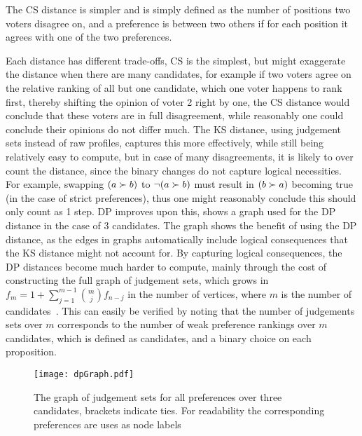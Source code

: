 The CS distance is simpler and is simply defined as the number of positions two
voters disagree on, and a preference is between two others if for each position
it agrees with one of the two preferences.

Each distance has different trade-offs, CS is the simplest, but might
exaggerate the distance when there are many candidates, for example if two voters
agree on the relative ranking of all but one candidate, which one voter happens
to rank first, thereby shifting the opinion of voter 2 right by one, the CS
distance would conclude that these voters are in full disagreement, while
reasonably one could conclude their opinions do not differ much. The KS
distance, using judgement sets instead of raw profiles, captures this more
effectively, while still being relatively easy to compute, but in case of many
disagreements, it is likely to over count the distance, since the binary
changes do not capture logical necessities. For example, swapping $( a \succ
	b)$ to $\neg (a \succ b)$ must result in $(b \succ a)$ becoming true (in the
case of strict preferences), thus one might reasonably conclude this should
only count as 1 step. DP improves upon this,  shows a
graph used for the DP distance in the case of 3 candidates. The graph shows the
benefit of using the DP distance, as the edges in graphs automatically include
logical consequences that the KS distance might not account for. By
capturing logical consequences, the DP distances become much harder to
compute, mainly through the cost of constructing the full graph of judgement
sets, which grows in $f_m = 1 + \sum_{j=1}^{m-1} \binom{m}{j} f_{n-j}$ in the
number of vertices, where $m$ is the number of
candidates~\cite{grossPreferentialArrangements1962}. This can easily be
verified by noting that the number of judgements sets over $m$ corresponds to
the number of weak preference rankings over $m$ candidates, which is defined as
candidates, and a binary choice on each proposition.



\vspace{1em}
\begin{figure}[ht]
	\centering
	\texttt{[image: dpGraph.pdf]}
	\caption{The graph of judgement sets for all preferences over three
		candidates, brackets indicate ties. For readability the corresponding
		preferences are uses as node labels}
	\label{figure:DPDistance}
\end{figure}



